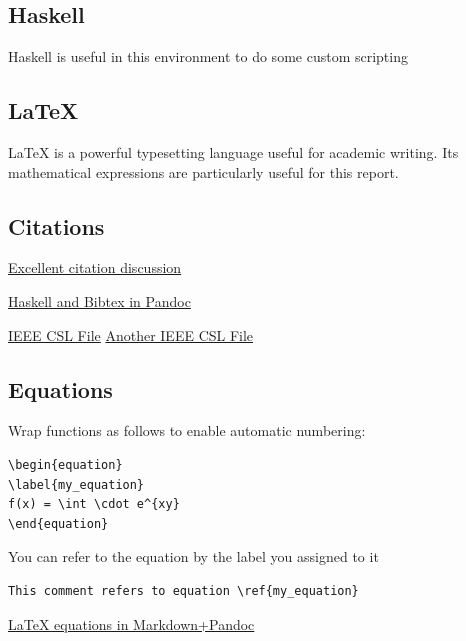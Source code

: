 \documentclass[]{article}
\begin{document}
\subsection{Haskell}\label{haskell}

Haskell is useful in this environment to do some custom scripting

\subsection{LaTeX}\label{latex}

LaTeX is a powerful typesetting language useful for academic writing.
Its mathematical expressions are particularly useful for this report.

\subsection{Citations}\label{citations}

\href{http://www.chriskrycho.com/2015/academic-markdown-and-citations.html}{Excellent
citation discussion}

\href{http://blog.wuzzeb.org/posts/2012-06-15-bibtex-and-pandoc.html}{Haskell
and Bibtex in Pandoc}

\href{https://gist.github.com/marcelofernandez/3264858}{IEEE CSL File}
\href{https://gist.github.com/dnguyen85/d41b0f0bba387c1c31b7}{Another
IEEE CSL File}

\subsection{Equations}\label{equations}

Wrap functions as follows to enable automatic numbering:

\begin{verbatim}
\begin{equation}
\label{my_equation}
f(x) = \int \cdot e^{xy}
\end{equation}
\end{verbatim}

You can refer to the equation by the label you assigned to it

\begin{verbatim}
This comment refers to equation \ref{my_equation}
\end{verbatim}

\href{http://stackoverflow.com/questions/25042901/how-to-use-latex-equation-environment-in-pandoc-markdown}{LaTeX
equations in Markdown+Pandoc}
\end{document}

